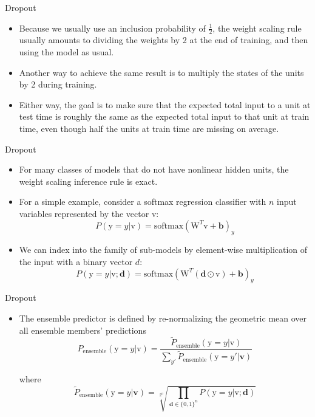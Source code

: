 \documentclass[10pt]{beamer}
\begin{document}
	\begin{frame}{Dropout}
		\begin{itemize}
			\item Because we usually use an inclusion probability of $\frac{1}{2}$, the weight scaling rule usually amounts to dividing the weights by 2 at the end of training, and then using the model as usual.
			\pause
			\item Another way to achieve the same result is to multiply the states of the units by 2 during training.
			\pause
			\item Either way, the goal is to make sure that the expected total input to a unit at test time is roughly the same as the expected total input to that unit at train time, even though half the units at train time are missing on average.
		\end{itemize}
	\end{frame}
	
	\begin{frame}{Dropout}
		\begin{itemize}
			\item For many classes of models that do not have nonlinear hidden units, the weight scaling inference rule is exact.
			\pause
			\item For a simple example, consider a softmax regression classifier with $n$ input variables represented by the vector $\bm{\mathrm{v}}$:
			$$P(\mathrm{y}=y|\bm{\mathrm{v}})=\mathrm{softmax}(\bm{\mathrm{W}}^T\bm{\mathrm{v}}+\bm{b})_y$$
			
			\pause
			\item We can index into the family of sub-models by element-wise multiplication of the input with a binary vector $d$:
			$$P(\mathrm{y}=y|\bm{\mathrm{v}};\bm{d})=\mathrm{softmax}(\bm{\mathrm{W}}^T(\bm{d}\odot\bm{\mathrm{v}})+\bm{b})_y$$
		\end{itemize}
	\end{frame}
	
	\begin{frame}{Dropout}
		\begin{itemize}
			\item The ensemble predictor is defined by re-normalizing the geometric mean over all ensemble members' predictions
			$$P_{\text{ensemble}}(\mathrm{y}=y|\bm{\mathrm{v}})=\frac{\tilde{P}_{\text{ensemble}}(\mathrm{y}=y|\bm{\mathrm{v}})}{\sum_{y'}\tilde{P}_{\text{ensemble}}(\mathrm{y}=y'|\bm{v})}$$
			
			where
			$$\tilde{P}_{\text{ensemble}}(\mathrm{y}=y|\bm{v})=\sqrt[2^n]{\prod_{\bm{d}\in\{0,1\}^n}P(\mathrm{y}=y|\bm{\mathrm{v}};\bm{d})}$$
		\end{itemize}
	\end{frame}
	
\end{document}
